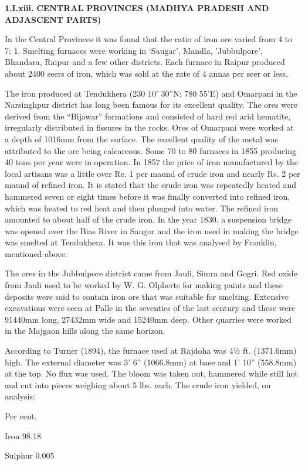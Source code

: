 \textbf{1.I.xiii.}\textbf{ CENTRAL PROVINCES (MADHYA PRADESH AND ADJASCENT PARTS)}

In the Central Provinces it was found that the ratio of iron ore varied from 4 to 7: 1. Smelting furnaces were working in ‘Saugar’, Mandla, 'Jubbulpore', Bhandara, Raipur and a few other districts. Each furnace in Raipur produced about 2400 seers of iron, which was sold at the rate of 4 annas per seer or less.

The iron produced at Tendukhera (230 10' 30''N: 780 55'E) and Omarpani in the Narsinghpur district has long been famous for its excellent quality. The ores were derived from the “Bijawar” formations and consisted of hard red arid hematite, irregularly distributed in fissures in the rocks. Ores of Omarpani were worked at a depth of 1016mm from the surface. The excellent quality of the metal was attributed to the ore being calcareous. Some 70 to 80 furnaces in 1855 producing 40 tons per year were in operation. In 1857 the price of iron manufactured by the local artisans was a little over Re. 1 per maund of crude iron and nearly Rs. 2 per maund of refined iron. It is stated that the crude iron was repeatedly heated and hammered seven or eight times before it was finally converted into refined iron, which was heated to red heat and then plunged into water. The refined iron amounted to about half of the crude iron. In the year 1830, a suspension bridge was opened over the Bias River in Saugor and the iron used in making the bridge was smelted at Tendukhera. It was this iron that was analysed by Franklin, mentioned above.

The ores in the Jubbulpore district came from Jauli, Simra and Gogri. Red oxide from Jauli used to be worked by W. G. Olpherts for making paints and these deposits were said to contain iron ore that was suitable for smelting. Extensive excavations were seen at Palle in the seventies of the last century and these were 91440mm long, 27432mm wide and 15240mm deep. Other quarries were worked in the Majgaon hills along the same horizon.

According to Turner (1894), the furnace used at Rajdoha was 4½ ft. (1371.6mm) high. The external diameter was 3' 6'' (1066.8mm) at base and 1' 10'' (558.8mm) at the top. No flux was used. The bloom was taken out, hammered while still hot and cut into pieces weighing about 5 lbs. each. The crude iron yielded, on analysis:

Per cent.

Iron 98.18

Sulphur 0.005

